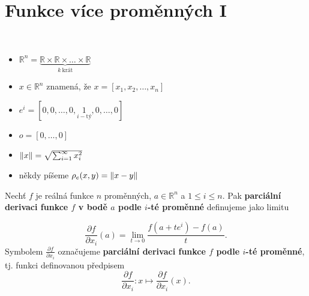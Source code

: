 \section{Funkce více proměnných I}
\begin{oznaceni}
    \,
    \begin{itemize}
	\item $\mathbb R ^n = \underbrace{\mathbb R \times \mathbb R  \times \dots \times \mathbb R}_{k\ \text{krát}} $
	\item $x \in \mathbb R ^n$ znamená, že $x=[x_1,x_2,\dots,x_n]$
	\item $e^i = [0,0,\dots,0, \underset{i-\text{tý}}{1},0,\dots,0]$
	\item $o=[0,\dots,0]$
	\item $\lVert x \rVert= \sqrt{\sum_{i=1}^\infty x_i^2}$
	\item někdy píšeme $\rho_e(x,y)=\lVert x-y \rVert$
    \end{itemize}
\end{oznaceni}

\begin{definice}
Nechť $f$ je reálná funkce $n$ proměnných,
$a\in\mathbb{R}^n$
a $1\le i\le n$.
Pak \textbf{parciální derivaci funkce $f$ v bodě $a$
podle $i$-té proměnné} definujeme jako limitu

\[
\frac{\partial f}{\partial x_i}(a)
=
\lim_{t\to0}
\frac{
f(a+t e^i)-f(a)
}{t}.
\]
Symbolem
$
\frac{\partial f}{\partial x_i}
$
označujeme \textbf{parciální derivaci funkce $f$
podle $i$-té proměnné}, tj. funkci definovanou
předpisem
\[
\frac{\partial f}{\partial x_i}
:
x\mapsto
\frac{\partial f}{\partial x_i}(x).
\]
\end{definice}

